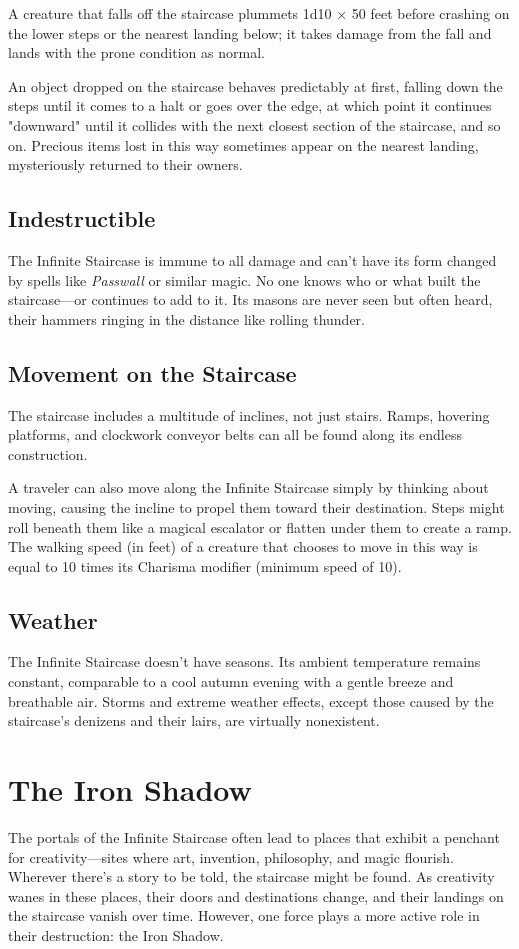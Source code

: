 \documentclass[10pt,a4paper,twoside,bg=print,twocolumn,openany,nodeprecatedcode]{dndbook}
\begin{document}
A creature that falls off the staircase plummets 1d10 × 50 feet before crashing on the lower steps or the nearest landing below; it takes damage from the fall and lands with the prone condition as normal.

An object dropped on the staircase behaves predictably at first, falling down the steps until it comes to a halt or goes over the edge, at which point it continues "downward" until it collides with the next closest section of the staircase, and so on. Precious items lost in this way sometimes appear on the nearest landing, mysteriously returned to their owners.

\subsection{Indestructible}
The Infinite Staircase is immune to all damage and can't have its form changed by spells like \textit{Passwall} or similar magic. No one knows who or what built the staircase—or continues to add to it. Its masons are never seen but often heard, their hammers ringing in the distance like rolling thunder.

\subsection{Movement on the Staircase}
The staircase includes a multitude of inclines, not just stairs. Ramps, hovering platforms, and clockwork conveyor belts can all be found along its endless construction.

A traveler can also move along the Infinite Staircase simply by thinking about moving, causing the incline to propel them toward their destination. Steps might roll beneath them like a magical escalator or flatten under them to create a ramp. The walking speed (in feet) of a creature that chooses to move in this way is equal to 10 times its Charisma modifier (minimum speed of 10).

\subsection{Weather}
The Infinite Staircase doesn't have seasons. Its ambient temperature remains constant, comparable to a cool autumn evening with a gentle breeze and breathable air. Storms and extreme weather effects, except those caused by the staircase's denizens and their lairs, are virtually nonexistent.

\section{The Iron Shadow}
The portals of the Infinite Staircase often lead to places that exhibit a penchant for creativity—sites where art, invention, philosophy, and magic flourish. Wherever there's a story to be told, the staircase might be found. As creativity wanes in these places, their doors and destinations change, and their landings on the staircase vanish over time. However, one force plays a more active role in their destruction: the Iron Shadow.
\end{document}

